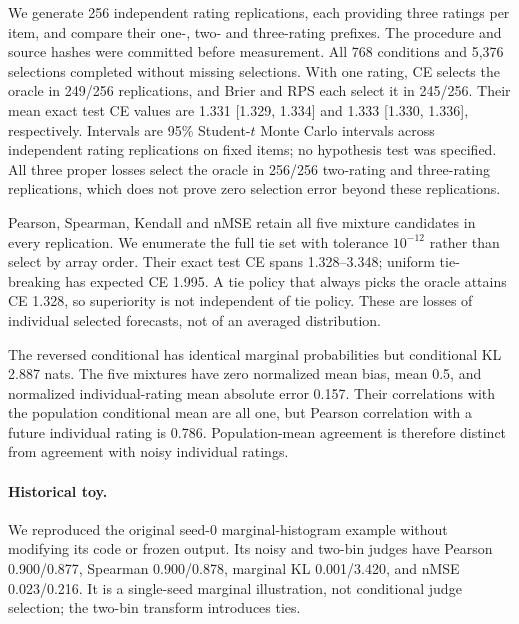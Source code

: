 We generate 256 independent rating replications, each providing three ratings per item, and compare their one-, two- and three-rating prefixes.
The procedure and source hashes were committed before measurement.
All 768 conditions and 5,376 selections completed without missing selections.
With one rating, CE selects the oracle in 249/256 replications, and Brier and RPS each select it in 245/256.
Their mean exact test CE values are 1.331 [1.329, 1.334] and 1.333 [1.330, 1.336], respectively.
Intervals are 95\% Student-$t$ Monte Carlo intervals across independent rating replications on fixed items; no hypothesis test was specified.
All three proper losses select the oracle in 256/256 two-rating and three-rating replications, which does not prove zero selection error beyond these replications.

Pearson, Spearman, Kendall and nMSE retain all five mixture candidates in every replication.
We enumerate the full tie set with tolerance $10^{-12}$ rather than select by array order.
Their exact test CE spans 1.328--3.348; uniform tie-breaking has expected CE 1.995.
A tie policy that always picks the oracle attains CE 1.328, so superiority is not independent of tie policy.
These are losses of individual selected forecasts, not of an averaged distribution.

The reversed conditional has identical marginal probabilities but conditional KL 2.887 nats.
The five mixtures have zero normalized mean bias, mean 0.5, and normalized individual-rating mean absolute error 0.157.
Their correlations with the population conditional mean are all one, but Pearson correlation with a future individual rating is 0.786.
Population-mean agreement is therefore distinct from agreement with noisy individual ratings.

\paragraph{Historical toy.}
We reproduced the original seed-0 marginal-histogram example without modifying its code or frozen output.
Its noisy and two-bin judges have Pearson 0.900/0.877, Spearman 0.900/0.878, marginal KL 0.001/3.420, and nMSE 0.023/0.216.
It is a single-seed marginal illustration, not conditional judge selection; the two-bin transform introduces ties.
